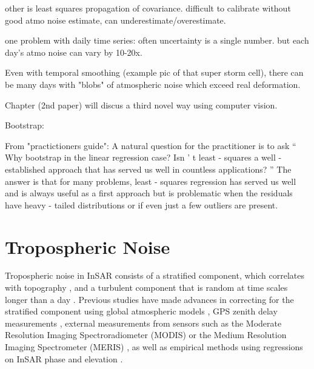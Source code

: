 \documentclass{utexasthesis}
\begin{document}
other is least squares propagation of covariance. difficult to calibrate without good atmo noise estimate, can underestimate/overestimate.

one problem with daily time series: often uncertainty is a single number. but each day's atmo noise can vary by 10-20x.

Even with temporal smoothing (example pic of that super storm cell), there can be many days with "blobs" of atmospheric noise which exceed real deformation.

Chapter (2nd paper) will discus a third novel way using computer vision.


Bootstrap:

From "practictioners guide":
A natural question for the practitioner is to ask  “ Why bootstrap in the linear regression case? Isn ’ t least - squares a well - established approach that  has  served  us  well  in  countless  applications? ”   The  answer  is  that  for  many  problems, least - squares regression has served us well and is always useful as  a first approach but is problematic when the residuals have heavy - tailed distributions or if even just a few outliers are present.



\section{Tropospheric Noise}


Tropospheric noise in InSAR consists of a stratified component, which correlates with topography \cite{Doin2009CorrectionsStratifiedTropospheric}, and a turbulent component that is random at time scales longer than a day \cite{Emardson2003NeutralAtmosphericDelay, Onn2006ModelingWaterVapor}. Previous studies have made advances in correcting for the stratified component using global atmospheric models \cite{Doin2009CorrectionsStratifiedTropospheric, Jolivet2014ImprovingInsarGeodesy, Cao2021AdvancedInsarTropospheric}, GPS zenith delay measurements \cite{Onn2006ModelingWaterVapor}, external measurements from sensors such as the Moderate Resolution Imaging Spectroradiometer (MODIS) \cite{Li2005InterferometricSyntheticAperture, Barnhart2013CharacterizingEstimatingNoise} or the Medium Resolution Imaging Spectrometer (MERIS)  \cite{Ding2008AtmosphericEffectsInsar}, as well as empirical methods using regressions on InSAR phase and elevation \cite{Zebker2021AccuracyModelFree, Murray2021ClusterBasedEmpirical}.
\end{document}
